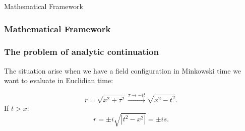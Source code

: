 \begin{section}{Mathematical Framework}
  \begin{frame}
    \frametitle{Mathematical Framework}
  \end{frame}

  \begin{frame}
    \frametitle{The problem of analytic continuation}
    The situation
    arise when we have a field configuration in Minkowski time we
    want to evaluate in Euclidian time:

    \begin{equation}
      r=\sqrt{x^2+\tau^2}\xrightarrow{\tau\to -it}\sqrt{x^2-t^2}.
    \end{equation}
    If $t>x$:
    \begin{equation*}
      r = \pm i \sqrt{|t^2-x^2|} = \pm i s.
    \end{equation*}
  \end{frame}


\end{section}
